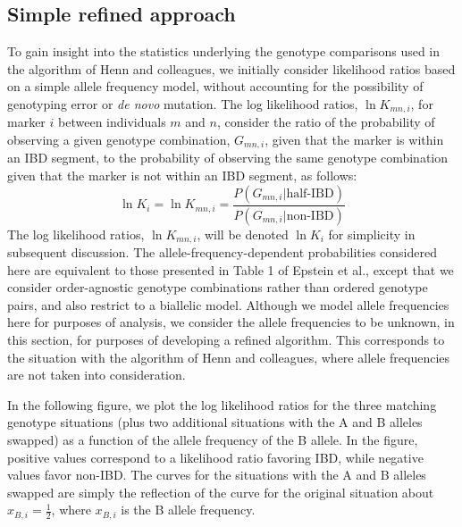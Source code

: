 \documentclass{article}
\begin{document}
\subsection{Simple refined approach}
To gain insight into the statistics underlying the genotype comparisons used in the algorithm of Henn and colleagues, we initially consider likelihood ratios based on a simple allele frequency model, without accounting for the possibility of genotyping error or \textit{de novo} mutation. The log likelihood ratios, $\ln K_{mn,i}$, for marker $i$ between individuals $m$ and $n$, consider the ratio of the probability of observing a given genotype combination, $G_{mn,i}$, given that the marker is within an IBD segment, to the probability of observing the same genotype combination given that the marker is not within an IBD segment, as follows:
\begin{equation}
  \ln K_i = \ln K_{mn,i} = \frac{P(G_{mn,i} | \text{half-IBD})}{P(G_{mn,i} | \text{non-IBD})}
\end{equation}
The log likelihood ratios, $\ln K_{mn,i}$, will be denoted $\ln K_i$ for simplicity in subsequent discussion. The allele-frequency-dependent probabilities considered here are equivalent to those presented in Table 1 of Epstein et al.,\citep{RELPAIR} except that we consider order-agnostic genotype combinations rather than ordered genotype pairs, and also restrict to a biallelic model. Although we model allele frequencies here for purposes of analysis, we consider the allele frequencies to be unknown, in this section, for purposes of developing a refined algorithm. This corresponds to the situation with the algorithm of Henn and colleagues, where allele frequencies are not taken into consideration.

In the following figure, we plot the log likelihood ratios for the three matching genotype situations (plus two additional situations with the A and B alleles swapped) as a function of the allele frequency of the B allele. In the figure, positive values correspond to a likelihood ratio favoring IBD, while negative values favor non-IBD. The curves for the situations with the A and B alleles swapped are simply the reflection of the curve for the original situation about $x_{B,i}=\frac{1}{2}$, where $x_{B,i}$ is the B allele frequency.
\end{document}
